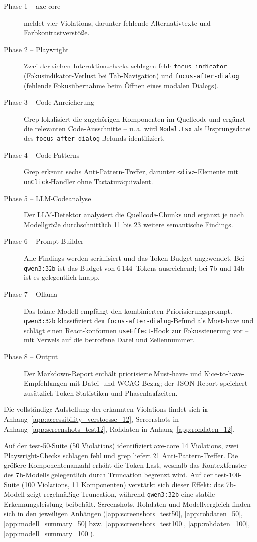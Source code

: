 \begin{description}
  \item[Phase 1 – axe-core] meldet vier Violations, darunter fehlende Alternativtexte und Farbkontrastverstöße.
  \item[Phase 2 – Playwright] Zwei der sieben Interaktionschecks schlagen fehl: \texttt{focus-indicator} (Fokusindikator-Verlust bei Tab-Navigation) und \texttt{focus-after-dialog} (fehlende Fokusübernahme beim Öffnen eines modalen Dialogs).
  \item[Phase 3 – Code-Anreicherung] Grep lokalisiert die zugehörigen Komponenten im Quellcode und ergänzt die relevanten Code-Ausschnitte -- u.\,a. wird \texttt{Modal.tsx} als Ursprungsdatei des \texttt{focus-after-dialog}-Befunds identifiziert.
  \item[Phase 4 – Code-Patterns] Grep erkennt sechs Anti-Pattern-Treffer, darunter \texttt{<div>}-Elemente mit \texttt{onClick}-Handler ohne Tastaturäquivalent.
  \item[Phase 5 – \ac{LLM}-Codeanalyse] Der \ac{LLM}-Detektor analysiert die Quellcode-Chunks und ergänzt je nach Modellgröße durchschnittlich 11 bis 23 weitere semantische Findings.
  \item[Phase 6 – Prompt-Builder] Alle Findings werden serialisiert und das Token-Budget angewendet. Bei \texttt{qwen3:32b} ist das Budget von 6\,144~Tokens ausreichend; bei 7b und 14b ist es gelegentlich knapp.
  \item[Phase 7 – Ollama] Das lokale Modell empfängt den kombinierten Priorisierungsprompt. \texttt{qwen3:32b} klassifiziert den \texttt{focus-after-dialog}-Befund als Must-have und schlägt einen React-konformen \texttt{useEffect}-Hook zur Fokussteuerung vor -- mit Verweis auf die betroffene Datei und Zeilennummer.
  \item[Phase 8 – Output] Der Markdown-Report enthält priorisierte Must-have- und Nice-to-have-Empfehlungen mit Datei- und \ac{WCAG}-Bezug; der \acs{JSON}-Report speichert zusätzlich Token-Statistiken und Phasenlaufzeiten.
\end{description}

Die vollständige Aufstellung der erkannten Violations findet sich in Anhang~\ref{app:accessibility_verstoesse_12}, Screenshots in Anhang~\ref{app:screenshots_test12}, Rohdaten in Anhang~\ref{app:rohdaten_12}.

Auf der test-50-Suite (50 Violations) identifiziert axe-core 14 Violations, zwei Playwright-Checks schlagen fehl und grep liefert 21 Anti-Pattern-Treffer. Die größere Komponentenanzahl erhöht die Token-Last, weshalb das Kontextfenster des 7b-Modells gelegentlich durch Truncation begrenzt wird. Auf der test-100-Suite (100 Violations, 11 Komponenten) verstärkt sich dieser Effekt: das 7b-Modell zeigt regelmäßige Truncation, während \texttt{qwen3:32b} eine stabile Erkennungsleistung beibehält. Screenshots, Rohdaten und Modellvergleich finden sich in den jeweiligen Anhängen (\ref{app:screenshots_test50}, \ref{app:rohdaten_50}, \ref{app:modell_summary_50} bzw.\ \ref{app:screenshots_test100}, \ref{app:rohdaten_100}, \ref{app:modell_summary_100}).

